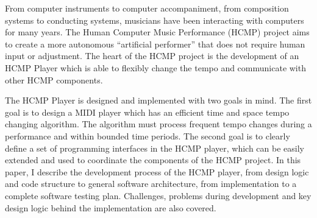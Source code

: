 


\begin{abstracts}
From computer instruments to computer accompaniment, from composition
systems to conducting systems, musicians have been interacting with
computers for many years. The Human Computer Music Performance (HCMP)
project aims to create a more autonomous ``artificial  performer'' that does
not require human input or adjustment. The heart of the HCMP project is the
development of an HCMP Player which is able to flexibly change the tempo and
communicate with other HCMP components.

The HCMP Player is designed and implemented with two goals in mind. The
first goal is to design a MIDI player which has an efficient time and space
tempo changing algorithm. The algorithm must process frequent tempo changes
during a performance and within bounded time periods. The second goal is to
clearly define a set of programming interfaces in the HCMP player, which can
be easily extended and used to coordinate the components of the HCMP
project. In this paper, I describe the development process of the HCMP
player, from design logic and code structure to general software
architecture, from implementation to a complete software testing plan.
Challenges, problems during development and key design logic behind the
implementation are also covered.
\end{abstracts}
